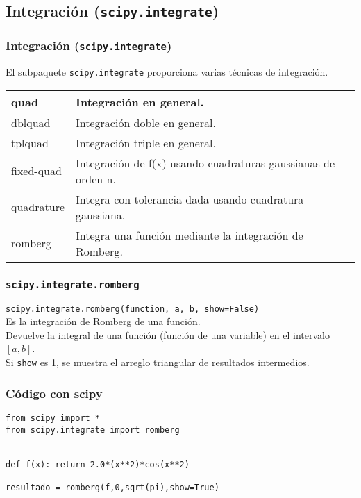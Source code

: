 \subsection{Integraci\'{o}n (\texttt{scipy.integrate})}
\begin{frame}
\frametitle{Integraci\'{o}n (\texttt{scipy.integrate})}
El subpaquete \texttt{scipy.integrate} proporciona varias t\'{e}cnicas de integraci\'{o}n.
\fontsize{12}{12}\selectfont
\begin{tabular}{l | p{8cm}}
quad 		& Integraci\'{o}n en general. \\ \hline
dblquad 	& Integraci\'{o}n doble en general. \\ \hline
tplquad 	& Integraci\'{o}n triple en general. \\ \hline
fixed-quad 	& Integraci\'{o}n de f(x) usando cuadraturas gaussianas de orden n. \\ \hline
quadrature 	& Integra con tolerancia dada usando cuadratura gaussiana. \\ \hline
romberg 	& Integra una funci\'{o}n mediante la integraci\'{o}n de Romberg.
\end{tabular}
\end{frame}
\begin{frame}[fragile]
\frametitle{\texttt{scipy.integrate.romberg}}
\fontsize{12}{12}\selectfont
\verb|scipy.integrate.romberg(function, a, b, show=False)|
\\
\bigskip
\fontsize{14}{14}\selectfont
Es la integraci\'{o}n de Romberg de una funci\'{o}n.
\\
\medskip
Devuelve la integral de una funci\'{o}n (funci\'{o}n de una variable) en el intervalo $[a,b]$.
\\
\medskip
Si \texttt{show} es 1, se muestra el arreglo triangular de resultados intermedios.
\end{frame}
\begin{frame}[fragile]
\frametitle{C\'{o}digo con scipy}
\begin{lstlisting}
from scipy import *
from scipy.integrate import romberg


def f(x): return 2.0*(x**2)*cos(x**2)

resultado = romberg(f,0,sqrt(pi),show=True)
\end{lstlisting}
\end{frame}
